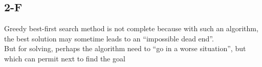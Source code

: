 \documentclass{article}
\begin{document}
        \subsection{2-F}
            Greedy best-first search method is not complete because with such an algorithm, the best solution may sometime leads to an ``impossible dead end''.\\
            But for solving, perhaps the algorithm need to ``go in a worse situation'', but which can permit next to find the goal
\end{document}
